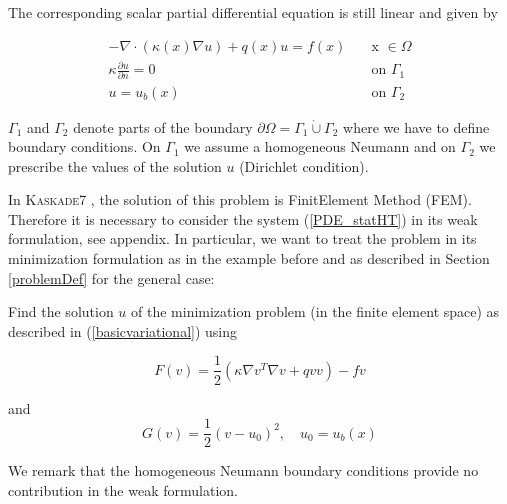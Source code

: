 \documentclass[11pt]{article}
\newcommand{\K}{\textsc{Kaskade7 }}
\begin{document}
\noindent The corresponding scalar partial differential equation is still linear and given by


\begin{equation}\label{PDE_statHT}
\begin{array}{rcl}
 -\nabla  \cdot (\kappa(x) \nabla u) + q(x) u = f(x) \quad &\mbox{x }\in  \Omega\\[2mm]
\kappa  \displaystyle \frac{\partial u}{\partial n} = 0 \quad & \mbox{on } \Gamma_1\\[3mm]
u = u_b(x) \quad & \mbox{on } \Gamma_2
\end{array}
\end{equation}

\noindent $\Gamma_1$ and $\Gamma_2$ denote parts of the boundary $\partial \Omega = \Gamma_1\dot{\cup} \Gamma_2$ where we have to define 
boundary conditions. On $\Gamma_1$ we assume a homogeneous Neumann and on 
$\Gamma_2$ we prescribe the values of the solution $u$ (Dirichlet condition).

In \K, the solution of this problem is  FinitElement Method (FEM). Therefore it is necessary to consider
the system (\ref{PDE_statHT}) in its weak formulation, see appendix. In particular, we want to treat the problem in its
minimization formulation as in the example before and as described in Section \ref{problemDef} for the general case:

Find the solution $u$ of the minimization problem (in the finite element space) as described in (\ref{basicvariational}) using

\[
F(v) = \frac{1}{2} (\kappa \nabla v^T \nabla v + q v v)  -  f v
\]

\noindent and 
\[
G(v) = \frac{1}{2} (v-u_0)^2, \quad u_0 = u_b(x)
\]

\noindent We remark that the homogeneous Neumann boundary conditions provide no contribution in the weak formulation.

%
%
\end{document}
